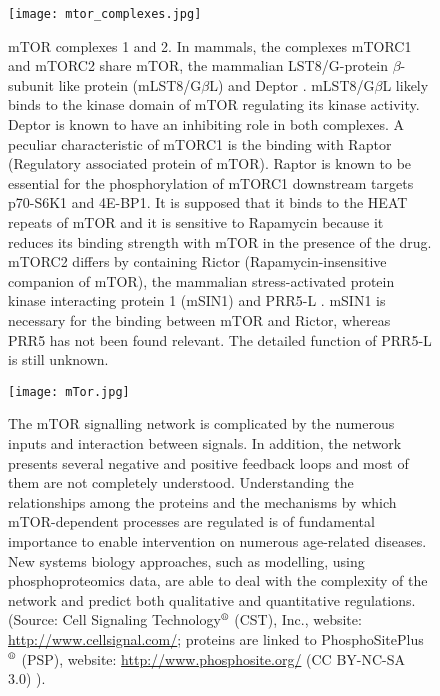 
\vspace{3cm}

\begin{figure}[hb]
	\begin{center}
		\texttt{[image: mtor\_complexes.jpg]}
		\caption[mTOR complexes 1 and 2]{mTOR complexes 1 and 2. In mammals, the complexes mTORC1 and mTORC2 share mTOR, the mammalian LST8/G-protein $\beta$-subunit like protein (mLST8/G$\beta$L) and Deptor \citep{Peterson2009}. mLST8/G$\beta$L likely binds to the kinase domain of mTOR regulating its kinase activity. Deptor is known to have an inhibiting role in both complexes. A peculiar characteristic of mTORC1 is the binding with Raptor (Regulatory associated protein of mTOR). Raptor is known to be essential for the phosphorylation of mTORC1 downstream targets p70-S6K1 and 4E-BP1. It is supposed that it binds to the HEAT repeats of mTOR and it is sensitive to Rapamycin because it reduces its binding strength with mTOR in the presence of the drug. mTORC2 differs by containing Rictor (Rapamycin-insensitive companion of mTOR), the mammalian stress-activated protein kinase interacting protein 1 (mSIN1) \citep{Frias2006} and PRR5-L \citep{Woo2007}. mSIN1 is necessary for the binding between mTOR and Rictor, whereas 
PRR5 has not been found relevant. The detailed function of PRR5-L is still unknown.}
		\label{fig:mtor_complexes}
	\end{center}
\end{figure}
\begin{figure}[tb]
	\begin{center}
		\texttt{[image: mTor.jpg]}
		\caption[mTOR signalling pathway]{The mTOR signalling network is complicated by the numerous inputs and interaction between signals. In addition, the network presents several negative and positive feedback loops and most of them are not completely understood. Understanding the relationships among the proteins and the mechanisms by which mTOR-dependent processes are regulated is of fundamental importance to enable intervention on numerous age-related diseases. New systems biology approaches, such as modelling, using phosphoproteomics data, are able to deal with the complexity of the network and predict both qualitative and quantitative regulations. (Source: Cell Signaling Technology$^\text{\textregistered}$ (CST), Inc., website: \url{http://www.cellsignal.com/}; proteins are linked to PhosphoSitePlus$^\text{\textregistered}$ (PSP), website: \url{http://www.phosphosite.org/} (CC BY-NC-SA 3.0) \citep{Hornbeck2012}).}
		\label{fig:mTOR}
	\end{center}
\end{figure}


\clearpage




